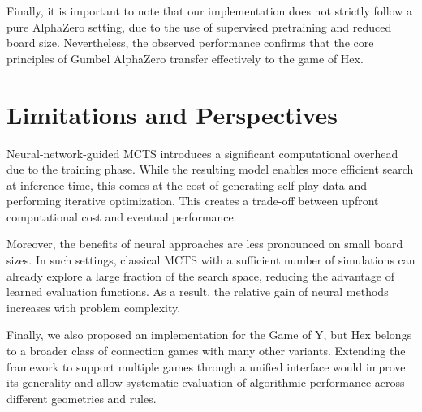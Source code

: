 \documentclass[11pt,a4paper]{article}
\begin{document}
Finally, it is important to note that our implementation does not strictly follow a pure AlphaZero setting, due to the use of supervised pretraining and reduced board size. Nevertheless, the observed performance confirms that the core principles of Gumbel AlphaZero transfer effectively to the game of Hex.

\section{Limitations and Perspectives}

Neural-network-guided MCTS introduces a significant computational overhead due to the training phase. While the resulting model enables more efficient search at inference time, this comes at the cost of generating self-play data and performing iterative optimization. This creates a trade-off between upfront computational cost and eventual performance.

\medskip

Moreover, the benefits of neural approaches are less pronounced on small board sizes. In such settings, classical MCTS with a sufficient number of simulations can already explore a large fraction of the search space, reducing the advantage of learned evaluation functions. As a result, the relative gain of neural methods increases with problem complexity.

\medskip

Finally, we also proposed an implementation for the Game of Y, but Hex belongs to a broader class of connection games with many other variants. Extending the framework to support multiple games through a unified interface would improve its generality and allow systematic evaluation of algorithmic performance across different geometries and rules.


\newpage



\end{document}
